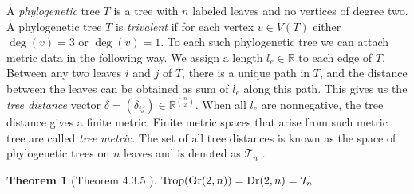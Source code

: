\documentclass[12pt]{article}
\newcommand{\RR}{\mathbb{R}}
\DeclareMathOperator{\Dr}{\rm Dr}
\DeclareMathOperator{\Trop}{Trop}
\theoremstyle{plain}
\newtheorem{theorem}{Theorem}
\theoremstyle{definition}
\numberwithin{subcase}{case}
\DeclareMathOperator{\Gr}{Gr}
\begin{document}
A \emph{phylogenetic} tree $T$ is a tree with $n$ labeled leaves and no vertices of degree two. A phylogenetic tree $T$ is \textit{trivalent} if for each vertex $v \in V(T)$ either $\deg(v) = 3$ or $\deg(v) = 1$. To each such phylogenetic tree we can attach metric data in the following way. We assign a length $l_{e} \in \mathbb{R}$ to each edge of $T$. Between any two leaves $i$ and $j$ of $T$, there is a unique path in $T$, and the distance between the leaves can be obtained as sum of $l_{e}$ along this path. This gives us the \emph{tree distance} vector $\delta = (\delta_{ij}) \in \mathbb{R}^{\binom{n}{2}}$. When all $l_{e}$ are nonnegative, the tree distance gives a finite metric. Finite metric spaces that arise from such metric tree are called \emph{tree metric}. The set of all tree distances is known as the space of phylogenetic trees on $n$ leaves and is denoted as $\mathcal{T}_{n}$ \cite{maclagan2021}.

\begin{theorem}[Theorem 4.3.5 \cite{maclagan2021}]\label{thm:rank2}
 $\Trop(\Gr(2,n)) = \Dr(2,n) = \mathcal{T}_{n}$
\end{theorem}









\end{document}
